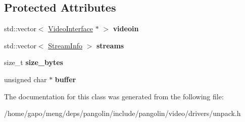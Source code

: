 \subsection*{Protected Attributes}
\begin{DoxyCompactItemize}
\item 
std\+::vector$<$ \hyperlink{structpangolin_1_1_video_interface}{Video\+Interface} $\ast$ $>$ {\bfseries videoin}\hypertarget{classpangolin_1_1_unpack_video_aa37278ebd42ef391ed12859cc3b934a6}{}\label{classpangolin_1_1_unpack_video_aa37278ebd42ef391ed12859cc3b934a6}

\item 
std\+::vector$<$ \hyperlink{classpangolin_1_1_stream_info}{Stream\+Info} $>$ {\bfseries streams}\hypertarget{classpangolin_1_1_unpack_video_a0f78b80d684d95ef0198ba8217a17f6d}{}\label{classpangolin_1_1_unpack_video_a0f78b80d684d95ef0198ba8217a17f6d}

\item 
size\+\_\+t {\bfseries size\+\_\+bytes}\hypertarget{classpangolin_1_1_unpack_video_a07c5cc6343560bac604c224ebf21241f}{}\label{classpangolin_1_1_unpack_video_a07c5cc6343560bac604c224ebf21241f}

\item 
unsigned char $\ast$ {\bfseries buffer}\hypertarget{classpangolin_1_1_unpack_video_a8c5ffa9fa5d6d57acba501224d48a832}{}\label{classpangolin_1_1_unpack_video_a8c5ffa9fa5d6d57acba501224d48a832}

\end{DoxyCompactItemize}


The documentation for this class was generated from the following file\+:\begin{DoxyCompactItemize}
\item 
/home/gapo/meng/deps/pangolin/include/pangolin/video/drivers/unpack.\+h\end{DoxyCompactItemize}
